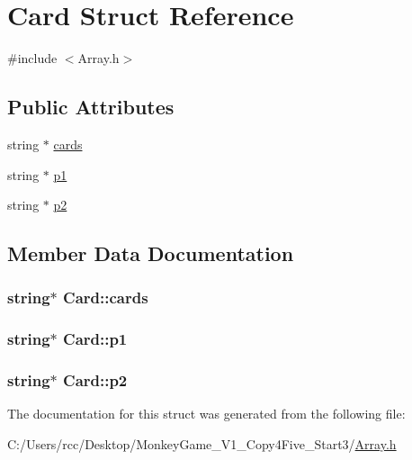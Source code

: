 \hypertarget{struct_card}{}\section{Card Struct Reference}
\label{struct_card}


{\ttfamily \#include $<$Array.\+h$>$}

\subsection*{Public Attributes}
\begin{DoxyCompactItemize}
\item 
string $\ast$ \hyperlink{struct_card_a3e3dcf05b4dd2dc5c0912068313701b2}{cards}
\item 
string $\ast$ \hyperlink{struct_card_aa4091225d41dc493be8338c4bd7cd328}{p1}
\item 
string $\ast$ \hyperlink{struct_card_a74435284e52d8899c46c8dd159b0a763}{p2}
\end{DoxyCompactItemize}


\subsection{Member Data Documentation}
\subsubsection[{\texorpdfstring{cards}{cards}}]{\setlength{\rightskip}{0pt plus 5cm}string$\ast$ Card\+::cards}\hypertarget{struct_card_a3e3dcf05b4dd2dc5c0912068313701b2}{}\label{struct_card_a3e3dcf05b4dd2dc5c0912068313701b2}
\subsubsection[{\texorpdfstring{p1}{p1}}]{\setlength{\rightskip}{0pt plus 5cm}string$\ast$ Card\+::p1}\hypertarget{struct_card_aa4091225d41dc493be8338c4bd7cd328}{}\label{struct_card_aa4091225d41dc493be8338c4bd7cd328}
\subsubsection[{\texorpdfstring{p2}{p2}}]{\setlength{\rightskip}{0pt plus 5cm}string$\ast$ Card\+::p2}\hypertarget{struct_card_a74435284e52d8899c46c8dd159b0a763}{}\label{struct_card_a74435284e52d8899c46c8dd159b0a763}


The documentation for this struct was generated from the following file\+:\begin{DoxyCompactItemize}
\item 
C\+:/\+Users/rcc/\+Desktop/\+Monkey\+Game\+\_\+\+V1\+\_\+\+Copy4\+Five\+\_\+\+Start3/\hyperlink{_array_8h}{Array.\+h}\end{DoxyCompactItemize}
